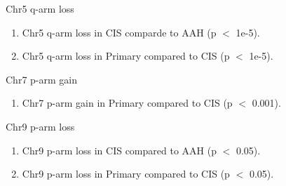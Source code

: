 \documentclass{beamer}
\begin{document}
\begin{frame}[allowframebreaks]
                \begin{block}{Chr5 q-arm loss}
                    \begin{enumerate}
                        \item Chr5 q-arm loss in CIS comparde to AAH (p $<$ 1e-5).
                        \item Chr5 q-arm loss in Primary compared to CIS (p $<$ 1e-5).
                    \end{enumerate}

                    \begin{table}
                        \caption{CGC Tier1 genes in Ch5 q-arm}
                        \resizebox{\linewidth}{!}
                        {}
                    \end{table}
                \end{block}

                \begin{block}{Chr7 p-arm gain}
                    \begin{enumerate}
                        \item Chr7 p-arm gain in Primary compared to CIS (p $<$ 0.001).
                    \end{enumerate}

                    \begin{table}
                        \caption{CGC Tier1 genes in Chr7 p-arm}
                        \resizebox{\linewidth}{!}
                        {}
                    \end{table}
                \end{block}

                \begin{block}{Chr9 p-arm loss}
                    \begin{enumerate}
                        \item Chr9 p-arm loss in CIS compared to AAH (p $<$ 0.05).
                        \item Chr9 p-arm loss in Primary compared to CIS (p $<$ 0.05).
                    \end{enumerate}

                    \begin{table}
                        \caption{CGC Tier1 genes in Chr9 p-arm}
                        \resizebox{\linewidth}{!}
                        {}
                    \end{table}
                \end{block}


\end{frame}
\end{document}

